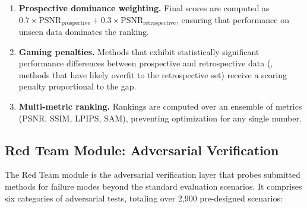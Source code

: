 \begin{enumerate}
  \item \textbf{Prospective dominance weighting.}
        Final scores are computed as $0.7 \times
        \text{PSNR}_{\mathrm{prospective}} + 0.3 \times
        \text{PSNR}_{\mathrm{retrospective}}$, ensuring that
        performance on unseen data dominates the ranking.

  \item \textbf{Gaming penalties.}
        Methods that exhibit statistically significant performance
        differences between prospective and retrospective data (\ie,
        methods that have likely overfit to the retrospective set)
        receive a scoring penalty proportional to the gap.

  \item \textbf{Multi-metric ranking.}
        Rankings are computed over an ensemble of metrics (PSNR, SSIM,
        LPIPS, SAM), preventing optimization for any single number.
\end{enumerate}


\subsection{Red Team Module: Adversarial Verification}
\label{sec:redteam}

The Red Team module is the adversarial verification layer that
probes submitted methods for failure modes beyond the standard
evaluation scenarios.
It comprises six categories of adversarial tests, totaling over 2{,}900
pre-designed scenarios:

